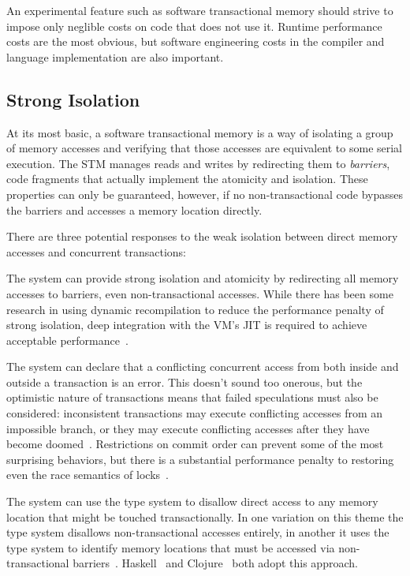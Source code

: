 
An experimental feature such as software transactional memory should strive to
impose only neglible costs on code that does not use it.  Runtime performance
costs are the most obvious, but software engineering costs in the compiler and
language implementation are also important.

\subsection*{Strong Isolation}

At its most basic, a software transactional memory is a way of isolating
a group of memory accesses and verifying that those accesses are
equivalent to some serial execution.  The STM manages reads and writes
by redirecting them to \textit{barriers}, code fragments that actually
implement the atomicity and isolation.  These properties can only be
guaranteed, however, if no non-transactional code bypasses the barriers
and accesses a memory location directly.

There are three potential responses to the weak isolation between direct memory
accesses and concurrent transactions:
\begin{packed_itemize}

\item The system can provide strong isolation and atomicity by redirecting
all memory accesses to barriers, even non-transactional accesses.  While
there has been some research in using dynamic recompilation to reduce the
performance penalty of strong isolation, deep integration with the VM's
JIT is required to achieve acceptable performance~\cite{inteldbo,mydbo}.

\item The system can declare that a conflicting concurrent access
from both inside and outside a transaction is an error.  This doesn't
sound too onerous, but the optimistic nature of transactions means
that failed speculations must also be considered: inconsistent
transactions may execute conflicting accesses from an impossible
branch, or they may execute conflicting accesses after they have become
doomed~\cite{grossman?get-cite-from-my-dbo}.  Restrictions on commit
order can prevent some of the most surprising behaviors, but there is
a substantial performance penalty to restoring even the race semantics
of locks~\cite{sgla}.

\item The system can use the type system to disallow direct access to
any memory location that might be touched transactionally.  In one
variation on this theme the type system disallows non-transactional
accesses entirely, in another it uses the type system to identify memory
locations that must be accessed via non-transactional
barriers~\cite{smallstepsemantics,cmt}.  Haskell~\cite{cmt} and 
Clojure~\cite{?} both adopt this approach.

\end{packed_itemize}

